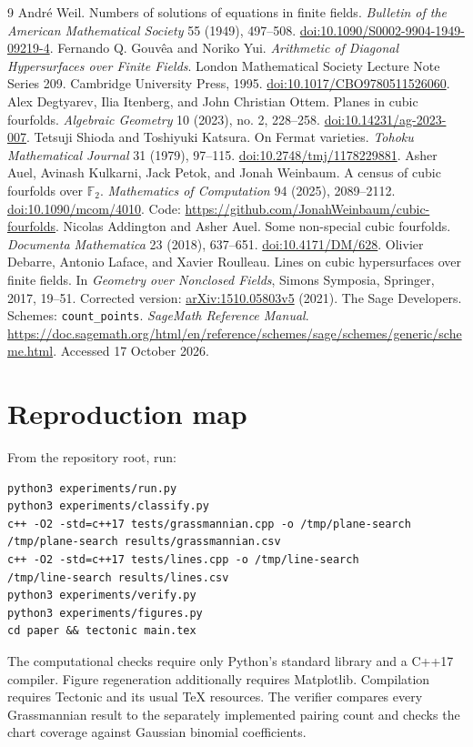 \documentclass[11pt]{article}
\theoremstyle{remark}\newtheorem{remark}[theorem]{Remark}
\newcommand{\F}{\mathbb F}\newcommand{\PP}{\mathbb P}\newcommand{\Z}{\mathbb Z}
\begin{document}
\begin{thebibliography}{9}
 Andr\'e Weil. Numbers of solutions of equations in finite fields. \emph{Bulletin of the American Mathematical Society} 55 (1949), 497--508. \href{https://doi.org/10.1090/S0002-9904-1949-09219-4}{doi:10.1090/S0002-9904-1949-09219-4}.
 Fernando Q. Gouv\^ea and Noriko Yui. \emph{Arithmetic of Diagonal Hypersurfaces over Finite Fields}. London Mathematical Society Lecture Note Series 209. Cambridge University Press, 1995. \href{https://doi.org/10.1017/CBO9780511526060}{doi:10.1017/CBO9780511526060}.
 Alex Degtyarev, Ilia Itenberg, and John Christian Ottem. Planes in cubic fourfolds. \emph{Algebraic Geometry} 10 (2023), no. 2, 228--258. \href{https://doi.org/10.14231/ag-2023-007}{doi:10.14231/ag-2023-007}.
 Tetsuji Shioda and Toshiyuki Katsura. On Fermat varieties. \emph{Tohoku Mathematical Journal} 31 (1979), 97--115. \href{https://doi.org/10.2748/tmj/1178229881}{doi:10.2748/tmj/1178229881}.
 Asher Auel, Avinash Kulkarni, Jack Petok, and Jonah Weinbaum. A census of cubic fourfolds over $\F_2$. \emph{Mathematics of Computation} 94 (2025), 2089--2112. \href{https://doi.org/10.1090/mcom/4010}{doi:10.1090/mcom/4010}. Code: \url{https://github.com/JonahWeinbaum/cubic-fourfolds}.
 Nicolas Addington and Asher Auel. Some non-special cubic fourfolds. \emph{Documenta Mathematica} 23 (2018), 637--651. \href{https://doi.org/10.4171/DM/628}{doi:10.4171/DM/628}.
 Olivier Debarre, Antonio Laface, and Xavier Roulleau. Lines on cubic hypersurfaces over finite fields. In \emph{Geometry over Nonclosed Fields}, Simons Symposia, Springer, 2017, 19--51. Corrected version: \href{https://arxiv.org/abs/1510.05803v5}{arXiv:1510.05803v5} (2021).
 The Sage Developers. Schemes: \texttt{count\_points}. \emph{SageMath Reference Manual}. \url{https://doc.sagemath.org/html/en/reference/schemes/sage/schemes/generic/scheme.html}. Accessed 17 October 2026.
\end{thebibliography}
\clearpage
\appendix
\section{Reproduction map}
From the repository root, run:
\begin{verbatim}
python3 experiments/run.py
python3 experiments/classify.py
c++ -O2 -std=c++17 tests/grassmannian.cpp -o /tmp/plane-search
/tmp/plane-search results/grassmannian.csv
c++ -O2 -std=c++17 tests/lines.cpp -o /tmp/line-search
/tmp/line-search results/lines.csv
python3 experiments/verify.py
python3 experiments/figures.py
cd paper && tectonic main.tex
\end{verbatim}
The computational checks require only Python's standard library and a C++17 compiler. Figure regeneration additionally requires Matplotlib. Compilation requires Tectonic and its usual TeX resources. The verifier compares every Grassmannian result to the separately implemented pairing count and checks the chart coverage against Gaussian binomial coefficients.
\end{document}
